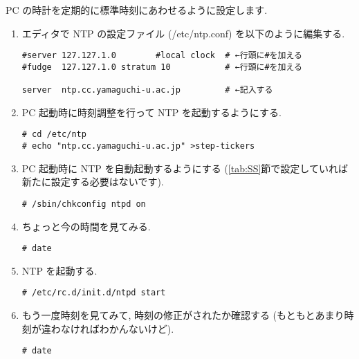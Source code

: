 \documentclass{jarticle}
\begin{document}
PC の時計を定期的に標準時刻にあわせるように設定します.
\begin{enumerate}
	\item エディタで NTP の設定ファイル (/etc/ntp.conf) を以下のように編集する.
\begin{verbatim}
#server 127.127.1.0        #local clock  # ←行頭に#を加える
#fudge  127.127.1.0 stratum 10           # ←行頭に#を加える

server  ntp.cc.yamaguchi-u.ac.jp         # ←記入する
\end{verbatim}
	\item PC 起動時に時刻調整を行って NTP を起動するようにする.
\begin{verbatim}
# cd /etc/ntp
# echo "ntp.cc.yamaguchi-u.ac.jp" >step-tickers
\end{verbatim}
	\item PC 起動時に NTP を自動起動するようにする
	      (\ref{tab:SS}節で設定していれば新たに設定する必要はないです).
\begin{verbatim}
# /sbin/chkconfig ntpd on
\end{verbatim}
	\item ちょっと今の時間を見てみる.
\begin{verbatim}
# date
\end{verbatim}
	\item NTP を起動する.
\begin{verbatim}
# /etc/rc.d/init.d/ntpd start
\end{verbatim}
	\item もう一度時刻を見てみて, 時刻の修正がされたか確認する
	      (もともとあまり時刻が違わなければわかんないけど).
\begin{verbatim}
# date
\end{verbatim}
\end{enumerate}
\end{document}
